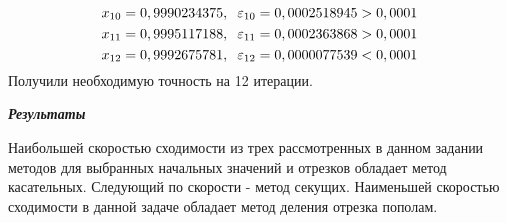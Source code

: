 \documentclass[12pt]{article}
\begin{document}
\begin{enumerate}[label=\textbf{\arabic*})]
\begin{equation*}
\end{equation*}
\begin{equation*}
	x_{10} = 0,9990234375, \hspace{0.2cm}
	\varepsilon_{10} = 0,0002518945 > 0,0001
\end{equation*}
\begin{equation*}
	x_{11} = 0,9995117188, \hspace{0.2cm}
	\varepsilon_{11} = 0,0002363868 > 0,0001
\end{equation*}
\begin{equation*}
	x_{12} = 0,9992675781, \hspace{0.2cm}
	\varepsilon_{12} = 0,0000077539 < 0,0001
\end{equation*}
Получили необходимую точность на 12 итерации.
\end{enumerate}
\begin{center}
	\textbf{\textit{Результаты}}
\end{center}
Наибольшей скоростью сходимости из трех рассмотренных в данном задании методов для выбранных начальных значений и отрезков обладает метод касательных. Следующий по скорости - метод секущих. Наименьшей скоростью сходимости в данной задаче обладает метод деления отрезка пополам. 
\end{document}

